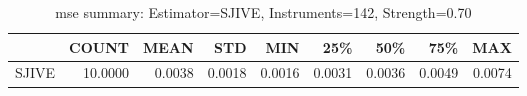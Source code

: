\begin{table}[ht]
\centering
\caption{mse summary: Estimator=SJIVE, Instruments=142, Strength=0.70}
\begin{tabular}{lrrrrrrrr}
\toprule
 & COUNT & MEAN & STD & MIN & 25\% & 50\% & 75\% & MAX \\
\midrule
SJIVE & 10.0000 & 0.0038 & 0.0018 & 0.0016 & 0.0031 & 0.0036 & 0.0049 & 0.0074 \\
\bottomrule
\end{tabular}
\end{table}
